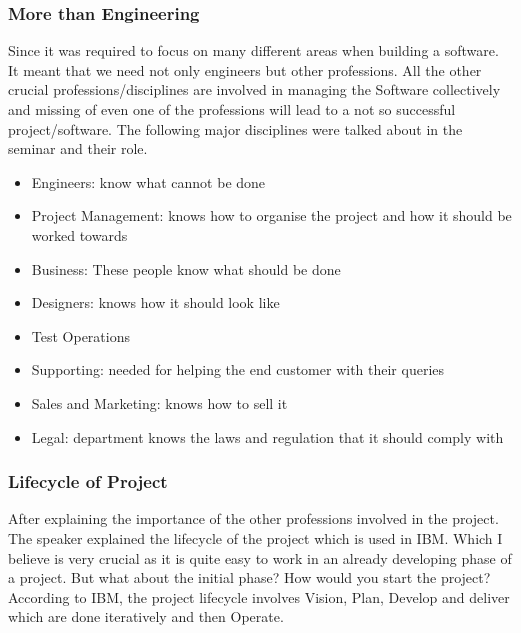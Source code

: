 \subsubsection{More than Engineering}

Since it was required to focus on many different areas when building a software. It meant that we need not only engineers but other professions. All the other crucial professions/disciplines are involved in managing the Software collectively and missing of even one of the professions will lead to a not so successful project/software. The following major disciplines were talked about in the seminar and their role.

\begin{itemize}
    \item Engineers: know what cannot be done
    \item Project Management: knows how to organise the project and how it should be worked towards
    \item Business: These people know what should be done
    \item Designers: knows how it should look like
    \item Test Operations
    \item Supporting: needed for helping the end customer with their queries
    \item Sales and Marketing: knows how to sell it
    \item Legal: department knows the laws and regulation that it should comply with
\end{itemize}

\subsubsection{Lifecycle of Project}

After explaining the importance of the other professions involved in the project. The speaker explained the lifecycle of the project which is used in IBM. Which I believe is very crucial as it is quite easy to work in an already developing phase of a project. But what about the initial phase? How would you start the project? According to IBM, the project lifecycle involves Vision, Plan, Develop and deliver which are done iteratively and then Operate.

